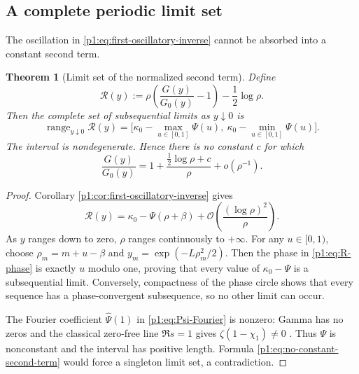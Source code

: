 \documentclass[11pt,oneside]{article}
\numberwithin{equation}{section}
\newtheorem{theorem}{Theorem}[section]
\theoremstyle{definition}
\theoremstyle{remark}
\newcommand{\bigO}{\mathcal O}
\newcommand{\smallo}{o}
\newcommand{\range}{\operatorname{range}}
\begin{document}
\subsection{A complete periodic limit set}

The oscillation in \eqref{p1:eq:first-oscillatory-inverse} cannot be absorbed into a
constant second term.

\begin{theorem}[Limit set of the normalized second term]
\label{p1:thm:inverse-limit-set}
Define
\begin{equation}
 \mathscr R(y):=
 \rho\left(\frac{G(y)}{G_0(y)}-1\right)-\frac12\log\rho.
 \label{p1:eq:R-limit-set}
\end{equation}
Then the complete set of subsequential limits as $y\downarrow0$ is
\begin{equation}
 \boxed{
 \range_{y\downarrow0}\mathscr R(y)
 =\bigl[\kappa_0-\max_{u\in[0,1]}\Psi(u),
         \ \kappa_0-\min_{u\in[0,1]}\Psi(u)\bigr].}
 \label{p1:eq:inverse-limit-interval}
\end{equation}
The interval is nondegenerate.  Hence there is no constant $c$ for which
\begin{equation}
 \frac{G(y)}{G_0(y)}
 =1+\frac{\tfrac12\log\rho+c}{\rho}+\smallo(\rho^{-1}).
 \label{p1:eq:no-constant-second-term}
\end{equation}
\end{theorem}

\begin{proof}
Corollary \ref{p1:cor:first-oscillatory-inverse} gives
\begin{equation}
 \mathscr R(y)=\kappa_0-\Psi(\rho+\beta)
 +\bigO\!\left(\frac{(\log\rho)^2}{\rho}\right).
 \label{p1:eq:R-phase}
\end{equation}
As $y$ ranges down to zero, $\rho$ ranges continuously to $+\infty$.  For any
$u\in[0,1)$, choose $\rho_m=m+u-\beta$ and
$y_m=\exp(-L\rho_m^2/2)$.  Then the phase in \eqref{p1:eq:R-phase} is exactly
$u$ modulo one, proving that every value of $\kappa_0-\Psi$ is a subsequential
limit.  Conversely, compactness of the phase circle shows that every sequence has a
phase-convergent subsequence, so no other limit can occur.

The Fourier coefficient $\widehat\Psi(1)$ in \eqref{p1:eq:Psi-Fourier} is nonzero:
Gamma has no zeros and the classical zero-free line $\Re s=1$ gives
$\zeta(1-\chi_1)\ne0$ \cite{p1:TitchmarshZeta}.  Thus $\Psi$ is nonconstant and the interval has positive
length.  Formula \eqref{p1:eq:no-constant-second-term} would force a singleton limit set,
a contradiction.
\end{proof}
\end{document}
